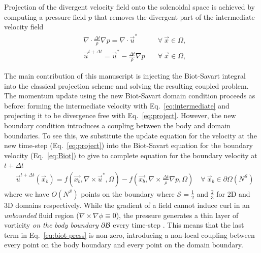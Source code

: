 \documentclass[11pt]{article}
\begin{document}
Projection of the divergent velocity field onto the solenoidal space is achieved by computing a pressure field $p$ that removes the divergent part of the intermediate velocity field
\begin{align}\label{eq:poisson}
      &\nabla\cdot\frac{\Delta t}{\rho}\nabla p = \nabla\cdot \vec{u}^* &\quad\forall\ \vec{x}\in\Omega,\\
      \label{eq:project}
      &\vec{u}^{t+\Delta t} = \vec{u}^*-\frac{\Delta t}{\rho}\nabla p &\quad\forall\ \vec{x}\in\Omega,
\end{align}

The main contribution of this manuscript is injecting the Biot-Savart integral into the classical projection scheme and solving the resulting coupled problem. The momentum update using the new Biot-Savart domain condition proceeds as before: forming the intermediate velocity with Eq.~\ref{eq:intermediate} and projecting it to be divergence free with Eq.~\ref{eq:project}. However, the new boundary condition introduces a coupling between the body and domain boundaries. To see this, we substitute the update equation for the velocity at the new time-step (Eq.~\ref{eq:project}) into the Biot-Savart equation for the boundary velocity (Eq.~\ref{eq:Biot}) to give to complete equation for the boundary velocity at $t+\Delta t$
\begin{align}\label{eq:biot-press}
    &\vec{u}^{t+\Delta t}(\vec x_b) = f(\vec{x_b},\nabla\times\vec{u}^*,\Omega)-f\left(\vec{x_b},\nabla\times\frac{\Delta t}{\rho}\nabla p,\Omega\right) \quad\forall\ \vec{x}_b \in \partial\Omega(N^\mathcal{S})
\end{align}
where we have $O(N^\mathcal{S})$ points on the boundary where $\mathcal{S}=\tfrac12$ and $\tfrac 23$ for 2D and 3D domains respectively. While the gradient of a field cannot induce curl in an \textit{unbounded} fluid region ($\nabla\times\nabla\phi\equiv 0$), the pressure generates a thin layer of vorticity \textit{on the body boundary} $\partial\cal B$ every time-step \cite{Morton1984GeophysicalTy}. This means that the last term in Eq.~\ref{eq:biot-press} is non-zero, introducing a non-local coupling between every point on the body boundary and every point on the domain boundary.
\end{document}
